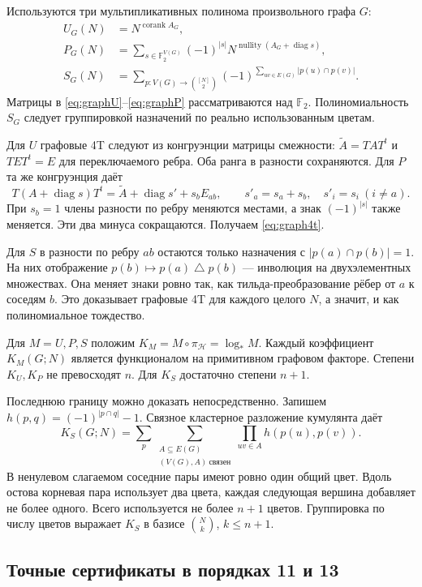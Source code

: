 \documentclass[11pt,a4paper]{article}
\numberwithin{equation}{section}
\theoremstyle{definition}
\theoremstyle{remark}
\newcommand{\F}{\mathbb F}
\newcommand{\corank}{\operatorname{corank}}
\begin{document}
Используются три мультипликативных полинома произвольного графа $G$:
\begin{align}
 U_G(N)&=N^{\corank A_G},\label{eq:graphU}\\
 P_G(N)&=\sum_{s\in\F_2^{V(G)}}(-1)^{|s|}
 N^{\operatorname{nullity}(A_G+\operatorname{diag}s)},\label{eq:graphP}\\
 S_G(N)&=\sum_{p:V(G)\to\binom{[N]}2}
 (-1)^{\sum_{uv\in E(G)}|p(u)\cap p(v)|}.\label{eq:graphS}
\end{align}
Матрицы в \eqref{eq:graphU}--\eqref{eq:graphP} рассматриваются над $\F_2$.
Полиномиальность $S_G$ следует группировкой назначений по реально
использованным цветам.

Для $U$ графовые 4T следуют из конгруэнции матрицы смежности:
$\widetilde A=TAT^t$ и $TET^t=E$ для переключаемого ребра.
Оба ранга в разности сохраняются.
Для $P$ та же конгруэнция даёт
\[
 T(A+\operatorname{diag}s)T^t
 =\widetilde A+\operatorname{diag}s'+s_bE_{ab},\qquad
 s'_a=s_a+s_b,\quad s'_i=s_i\ (i\ne a).
\]
При $s_b=1$ члены разности по ребру меняются местами, а знак
$(-1)^{|s|}$ также меняется. Эти два минуса сокращаются.
Получаем \eqref{eq:graph4t}.

Для $S$ в разности по ребру $ab$ остаются только назначения с
$|p(a)\cap p(b)|=1$. На них отображение
$p(b)\mapsto p(a)\mathbin\triangle p(b)$ --- инволюция на
двухэлементных множествах. Она меняет знаки ровно так, как
тильда-преобразование рёбер от $a$ к соседям $b$.
Это доказывает графовые 4T для каждого целого $N$, а значит,
и как полиномиальное тождество.

Для $M=U,P,S$ положим $K_M=M\circ\pi_{\mathcal H}=\log_*M$.
Каждый коэффициент $K_M(G;N)$ является функционалом на примитивном
графовом факторе. Степени $K_U,K_P$ не превосходят $n$.
Для $K_S$ достаточно степени $n+1$.

Последнюю границу можно доказать непосредственно. Запишем
$h(p,q)=(-1)^{|p\cap q|}-1$. Связное кластерное разложение кумулянта даёт
\[
 K_S(G;N)=\sum_p\sum_{\substack{A\subseteq E(G)\\(V(G),A)\ \text{связен}}}
 \prod_{uv\in A}h(p(u),p(v)).
\]
В ненулевом слагаемом соседние пары имеют ровно один общий цвет.
Вдоль остова корневая пара использует два цвета, каждая следующая
вершина добавляет не более одного. Всего используется не более
$n+1$ цветов. Группировка по числу цветов выражает $K_S$ в базисе
$\binom Nk$, $k\le n+1$.

\subsection{Точные сертификаты в порядках 11 и 13}
\end{document}
